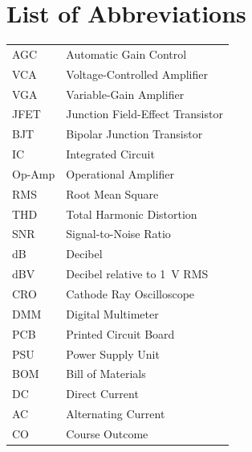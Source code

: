 \chapter*{List of Abbreviations}

\begin{tabularx}{\textwidth}{@{}lX@{}}
AGC & Automatic Gain Control \\
VCA & Voltage-Controlled Amplifier \\
VGA & Variable-Gain Amplifier \\
JFET & Junction Field-Effect Transistor \\
BJT & Bipolar Junction Transistor \\
IC & Integrated Circuit \\
Op-Amp & Operational Amplifier \\
RMS & Root Mean Square \\
THD & Total Harmonic Distortion \\
SNR & Signal-to-Noise Ratio \\
dB & Decibel \\
dBV & Decibel relative to 1~V RMS \\
CRO & Cathode Ray Oscilloscope \\
DMM & Digital Multimeter \\
PCB & Printed Circuit Board \\
PSU & Power Supply Unit \\
BOM & Bill of Materials \\
DC & Direct Current \\
AC & Alternating Current \\
CO & Course Outcome \\
\end{tabularx}


